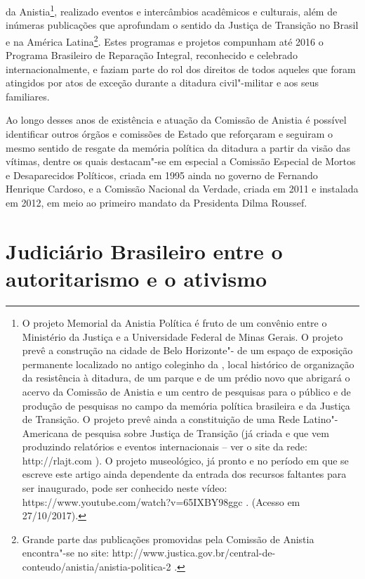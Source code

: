 da Anistia\footnote{O projeto Memorial da Anistia Política é fruto de um
  convênio entre o Ministério da Justiça e a Universidade Federal de
  Minas Gerais. O projeto prevê a construção na cidade de Belo
  Horizonte"- de um espaço de exposição permanente localizado no antigo
  coleginho da , local histórico de organização da resistência à
  ditadura, de um parque e de um prédio novo que abrigará o acervo da
  Comissão de Anistia e um centro de pesquisas para o público e de
  produção de pesquisas no campo da memória política brasileira e da
  Justiça de Transição. O projeto prevê ainda a constituição de uma Rede
  Latino"-Americana de pesquisa sobre Justiça de Transição (já criada e
  que vem produzindo relatórios e eventos internacionais -- ver o site da
  rede: http://rlajt.com ). O projeto museológico, já pronto e no
  período em que se escreve este artigo ainda dependente da entrada dos
  recursos faltantes para ser inaugurado, pode ser conhecido neste
  vídeo: https://www.youtube.com/watch?v=65IXBY98ggc . (Acesso em
  27/10/2017).}, realizado eventos e intercâmbios acadêmicos e
culturais, além de inúmeras publicações que aprofundam o sentido da
Justiça de Transição no Brasil e na América Latina\footnote{Grande parte
  das publicações promovidas pela Comissão de Anistia encontra"-se no
  site:
  http://www.justica.gov.br/central-de-conteudo/anistia/anistia-politica-2
  .}. Estes programas e projetos compunham até 2016 o Programa
Brasileiro de Reparação Integral, reconhecido e celebrado
internacionalmente, e faziam parte do rol dos direitos de todos aqueles
que foram atingidos por atos de exceção durante a ditadura civil"-militar
e aos seus familiares.

Ao longo desses anos de existência e atuação da Comissão de Anistia é
possível identificar outros órgãos e comissões de Estado que reforçaram
e seguiram o mesmo sentido de resgate da memória política da ditadura a
partir da visão das vítimas, dentre os quais destacam"-se em especial a
Comissão Especial de Mortos e Desaparecidos Políticos, criada em 1995
ainda no governo de Fernando Henrique Cardoso, e a Comissão Nacional da
Verdade, criada em 2011 e instalada em 2012, em meio ao primeiro mandato
da Presidenta Dilma Roussef.

\section{Judiciário Brasileiro entre o autoritarismo e o ativismo}

